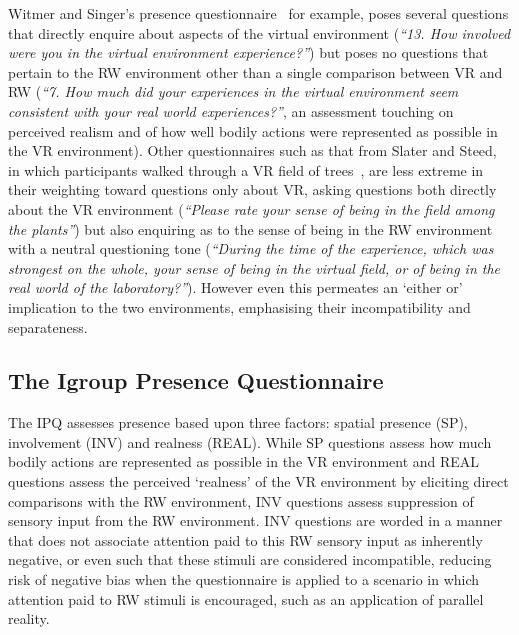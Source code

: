 Witmer and Singer's presence questionnaire~\cite{Witmer1998} for example, poses several questions that directly enquire about aspects of the virtual environment (\textit{``13. How involved were you in the virtual environment experience?''}) but poses no questions that pertain to the RW environment other than a single comparison between VR and RW (\textit{``7. How much did your experiences in the virtual environment seem consistent with your real world experiences?''}, an assessment touching on perceived realism and of how well bodily actions were represented as possible in the VR environment). Other questionnaires such as that from Slater and Steed, in which participants walked through a VR field of trees~\cite{Slater1998}, are less extreme in their weighting toward questions only about VR, asking questions both directly about the VR environment (\textit{``Please rate your sense of being in the field among the plants''}) but also enquiring as to the sense of being in the RW environment with a neutral questioning tone (\textit{``During the time of the experience, which was strongest on the whole, your sense of being in the virtual field, or of being in the real world of the laboratory?''}). However even this permeates an `either or' implication to the two environments, emphasising their incompatibility and separateness.


\subsection{The Igroup Presence Questionnaire}
\label{igroup-presence-questionnaire-explanation}
The IPQ assesses presence based upon three factors: spatial presence (SP), involvement (INV) and realness (REAL). While SP questions assess how much bodily actions are represented as possible in the VR environment and REAL questions assess the perceived `realness' of the VR environment by eliciting direct comparisons with the RW environment, INV questions assess suppression of sensory input from the RW environment. INV questions are worded in a manner that does not associate attention paid to this RW sensory input as inherently negative, or even such that these stimuli are considered incompatible, reducing risk of negative bias when the questionnaire is applied to a scenario in which attention paid to RW stimuli is encouraged, such as an application of parallel reality.

